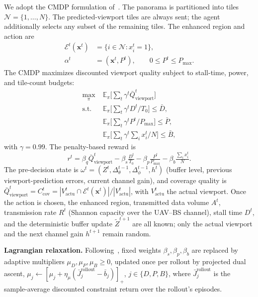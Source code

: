 \documentclass[conference]{IEEEtran}
\newcommand{\mbf}[1]{\mathbf{#1}}
\newcommand{\EE}{\mathbb{E}}
\begin{document}
We adopt the CMDP formulation of~\cite{ref_mmsp25}. The panorama is partitioned into
tiles $\mathcal{N}=\{1,\dots,N\}$. The predicted-viewport tiles are always sent; the
agent additionally selects any subset of the remaining tiles. The enhanced region and
action are
\begin{align}
\mathcal{E}^t(\mbf{x}^t) &= \{i \in \mathcal{N} : x_i^t = 1\}, \\
\alpha^t &= (\mbf{x}^t, P^t), \qquad 0 \le P^t \le P_{\max}.
\end{align}
The CMDP maximizes discounted viewport quality subject to stall-time, power, and
tile-count budgets:
\begin{align}
\max_\pi \; & \EE_\pi\Big[\textstyle\sum_{t} \gamma^t \bar Q^t_{\text{viewport}}\Big] \\
\text{s.t. } & \EE_\pi\Big[\textstyle\sum_t \gamma^t D^t / T_0\Big] \le \bar D, \\
& \EE_\pi\Big[\textstyle\sum_t \gamma^t P^t / P_{\max}\Big] \le \bar P, \\
& \EE_\pi\Big[\textstyle\sum_t \gamma^t \textstyle\sum_i x_i^t / N\Big] \le \bar B,
\end{align}
with $\gamma=0.99$. The penalty-based reward is
\begin{equation}
r^t = \beta_q \bar Q^t_{\text{viewport}} - \beta_s \tfrac{D^t}{T_0} - \beta_p \tfrac{P^t}{P_{\max}} - \beta_b \tfrac{\sum_i x_i^t}{N}.
\end{equation}
The pre-decision state is $\omega^t = (Z^t, \Delta_\theta^{t-1}, \Delta_\phi^{t-1}, h^t)$
(buffer level, previous viewport-prediction errors, current channel gain), and coverage
quality is $\bar Q^t_{\text{viewport}} = C^t_{\text{cov}} = |V^t_{\text{actu}} \cap
\mathcal{E}^t(\mbf{x}^t)| / |V^t_{\text{actu}}|$, with $V^t_{\text{actu}}$ the actual
viewport. Once the action is chosen, the enhanced region, transmitted data volume
$A^t$, transmission rate $R^t$ (Shannon capacity over the UAV--BS channel), stall time
$D^t$, and the deterministic buffer update $\tilde Z^{t+1}$ are all known; only the
actual viewport and the next channel gain $h^{t+1}$ remain random.

\textbf{Lagrangian relaxation.} Following~\cite{ref_mmsp25}, fixed weights
$\beta_s,\beta_p,\beta_b$ are replaced by adaptive multipliers
$\mu_D,\mu_P,\mu_B \ge 0$, updated once per rollout by projected dual ascent,
$\mu_j \leftarrow [\mu_j + \eta_\mu (\bar J_j^{\text{rollout}} - \bar b_j)]_+$,
$j\in\{D,P,B\}$, where $\bar J_j^{\text{rollout}}$ is the sample-average discounted
constraint return over the rollout's episodes.
\end{document}
